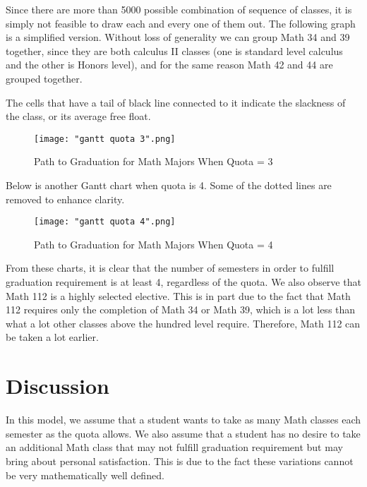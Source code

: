 \documentclass[12pt, oneside]{article}
\begin{document}
\bigskip


Since there are more than 5000 possible combination of sequence of classes, it is simply not feasible to draw each and every one of them out. The following graph is a simplified version. Without loss of generality we can group Math 34 and 39 together, since they are both calculus II classes (one is standard level calculus and the other is Honors level), and for the same reason Math 42 and 44 are grouped together.

\bigskip


The cells that have a tail of black line connected to it indicate the slackness of the class, or its average free float.  

\bigskip


\begin{figure}[H]
\caption{Path to Graduation for Math Majors When Quota = 3}
\texttt{[image: "gantt quota 3".png]}
\end{figure}

\bigskip


Below is another Gantt chart when quota is 4. Some of the dotted lines are removed to enhance clarity.

\bigskip


\begin{figure}[!htb]
\caption{Path to Graduation for Math Majors When Quota = 4}
\texttt{[image: "gantt quota 4".png]}
\end{figure}

\bigskip


From these charts, it is clear that the number of semesters in order to fulfill graduation requirement is at least 4, regardless of the quota. We also observe that Math 112 is a highly selected elective. This is in part due to the fact that Math 112 requires only the completion of Math 34 or Math 39, which is a lot less than what a lot other classes above the hundred level require. Therefore, Math 112 can be taken a lot earlier. 


\section{Discussion}


In this model, we assume that a student wants to take as many Math classes each semester as the quota allows. We also assume that a student has no desire to take an additional Math class that may not fulfill graduation requirement but may bring about personal satisfaction. This is due to the fact these variations cannot be very mathematically well defined. 
\end{document}
